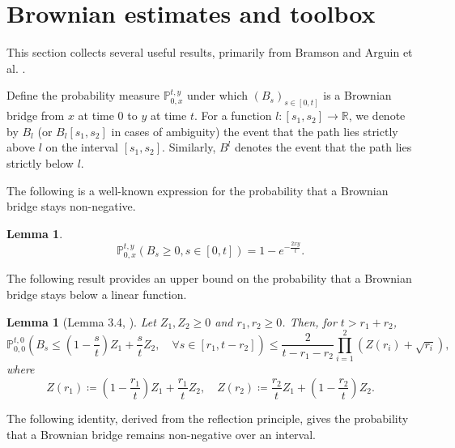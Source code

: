 \documentclass{article}
\newtheorem{lemma}[theorem]{Lemma}
\newcommand{\Prob}{\mathbb{P}}
\begin{document}
\section{Brownian estimates and toolbox}\label{sec:toolbox}

This section collects several useful results, primarily from Bramson \cite{Bramson1983ConvergenceOS} and Arguin et al. \cite{Arguin2016}.

Define the probability measure $\Prob_{0,x}^{t,y}$ under which $(B_s)_{s \in [0,t]}$ is a Brownian bridge from $x$ at time $0$ to $y$ at time $t$. For a function $l : [s_1,s_2] \to \mathbb{R}$, we denote by $B_l$ (or $B_l[s_1,s_2]$ in cases of ambiguity) the event that the path lies strictly above $l$ on the interval $[s_1, s_2]$. Similarly, $B^l$ denotes the event that the path lies strictly below $l$.

The following is a well-known expression for the probability that a Brownian bridge stays non-negative.
\begin{lemma}\label{bmbar}
\begin{equation}
    \Prob_{0,x}^{t,y}(B_s \geq 0 , s \in [0,t]) = 1 - e^{-\frac{2xy}{t}}.
\end{equation}
\end{lemma}


The following result provides an upper bound on the probability that a Brownian bridge stays below a linear function.
\begin{lemma}[Lemma 3.4, \cite{Arguin2016}]\label{34Arguin}
Let \( Z_1, Z_2 \geq 0 \) and \( r_1, r_2 \geq 0 \). Then, for \( t > r_1 + r_2 \),
\[
\mathbb{P}_{0,0}^{t,0} \left( B_s \leq \left(1 - \frac{s}{t} \right) Z_1 + \frac{s}{t} Z_2, \quad \forall s \in [r_1, t - r_2] \right) \leq \frac{2}{t - r_1 - r_2} \prod_{i=1}^2 \left( Z(r_i) + \sqrt{r_i} \right),
\]
where
\[
Z(r_1) \coloneqq \left(1 - \frac{r_1}{t} \right) Z_1 + \frac{r_1}{t} Z_2, \quad Z(r_2) \coloneqq \frac{r_2}{t} Z_1 + \left(1 - \frac{r_2}{t} \right) Z_2.
\]
\end{lemma}

The following identity, derived from the reflection principle, gives the probability that a Brownian bridge remains non-negative over an interval.
\end{document}
